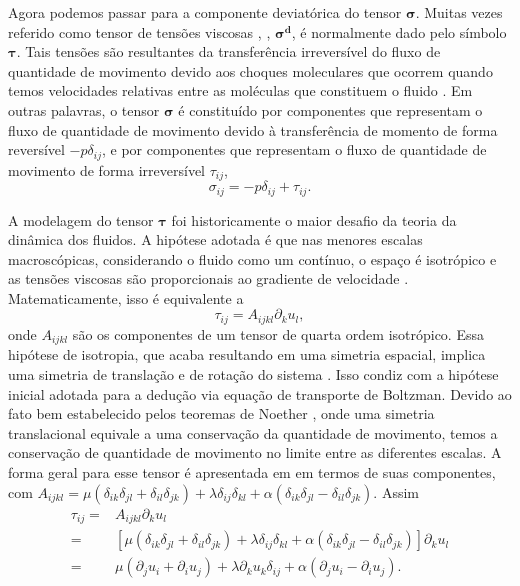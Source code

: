 Agora podemos passar para a componente deviatórica do tensor $\boldsymbol{\sigma}$. Muitas vezes referido como tensor de tensões viscosas \cite{landau2013fluid}, \cite{white2006viscous}, $\boldsymbol{\sigma^{d}}$, é normalmente dado pelo símbolo $\boldsymbol{\tau}$. Tais tensões são resultantes da transferência irreversível do fluxo de quantidade de movimento devido aos choques moleculares que ocorrem quando temos velocidades relativas entre as moléculas que constituem o fluido \cite{landau2013fluid}. Em outras palavras, o tensor $\boldsymbol{\sigma}$ é constituído por componentes que representam o fluxo de quantidade de movimento devido à transferência de momento de forma reversível $-p\delta_{ij}$, e por componentes que representam o fluxo de quantidade de movimento de forma irreversível $\tau_{ij}$, 
\begin{equation}\label{sigma_2}
\sigma_{ij} = -p\delta_{ij} + \tau_{ij}.
\end{equation}

A modelagem do tensor $\boldsymbol{\tau}$ foi historicamente o maior desafio da teoria da dinâmica dos fluidos. A hipótese adotada é que nas menores escalas macroscópicas, considerando o fluido como um contínuo, o espaço é isotrópico e as tensões viscosas são proporcionais ao gradiente de velocidade \cite{batchelor2000introduction}. Matematicamente, isso é equivalente a 
\begin{equation}\label{tau1}
\tau_{ij} = A_{ijkl}\partial_{k}u_{l},
\end{equation}
onde $A_{ijkl}$ são os componentes de um tensor de quarta ordem isotrópico. Essa hipótese de isotropia, que acaba resultando em uma simetria espacial, implica uma simetria de translação e de rotação do sistema \cite{lesieur2008turbulence}. Isso condiz com a hipótese inicial adotada para a dedução via equação de transporte de Boltzman. Devido ao fato bem estabelecido pelos teoremas de Noether \cite{landau1982mechanics}, onde uma simetria translacional equivale a uma conservação da quantidade de movimento, temos a conservação de quantidade de movimento no limite entre as diferentes escalas. A forma geral para esse tensor é apresentada em \cite{jeffreys1961cartesian} em termos de suas componentes, com $A_{ijkl} = \mu(\delta_{ik}\delta_{jl} + \delta_{il}\delta_{jk}) + \lambda\delta_{ij}\delta_{kl} + \alpha(\delta_{ik}\delta_{jl} - \delta_{il}\delta_{jk})$. Assim
\begin{equation}\label{tau2}
\begin{split}
\tau_{ij} = &A_{ijkl}\partial_{k}u_{l}\\
=& \left[\mu(\delta_{ik}\delta_{jl} + \delta_{il}\delta_{jk}) + \lambda\delta_{ij}\delta_{kl} + \alpha(\delta_{ik}\delta_{jl} - \delta_{il}\delta_{jk})\right]\partial_{k}u_{l}\\
=&\mu\left(\partial_{j}u_{i} + \partial_{i}u_{j}\right) + \lambda\partial_{k}u_{k}\delta_{ij} + \alpha\left(\partial_{j}u_{i} - \partial_{i}u_{j}\right).
\end{split}
\end{equation}


